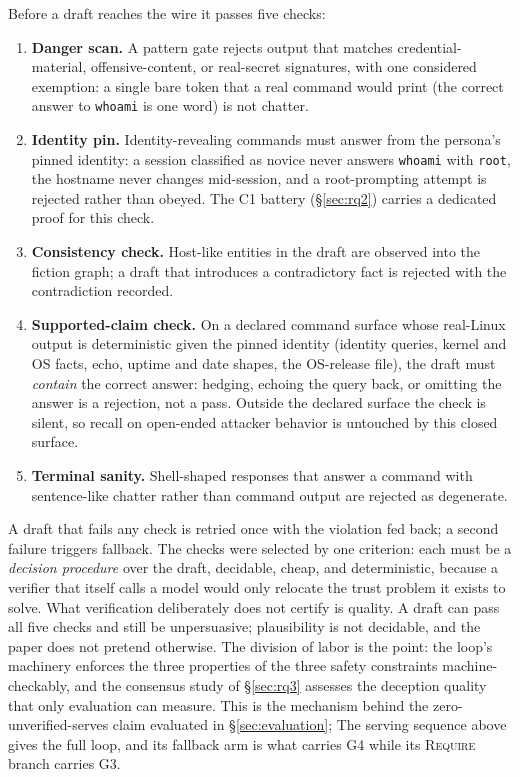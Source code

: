 Before a draft reaches the wire it passes five checks:
\begin{enumerate}
\item \textbf{Danger scan.} A pattern gate rejects output that matches
credential-material, offensive-content, or real-secret signatures, with
one considered exemption: a single bare token that a real command would
print (the correct answer to \texttt{whoami} is one word) is not chatter.
\item \textbf{Identity pin.} Identity-revealing commands must answer from
the persona's pinned identity: a session classified as novice never
answers \texttt{whoami} with \texttt{root}, the hostname never changes
mid-session, and a root-prompting attempt is rejected rather than
obeyed. The C1 battery (\S\ref{sec:rq2}) carries a dedicated proof for
this check.
\item \textbf{Consistency check.} Host-like entities in the draft are
observed into the fiction graph; a draft that introduces a contradictory
fact is rejected with the contradiction recorded.
\item \textbf{Supported-claim check.} On a declared command surface whose
real-Linux output is deterministic given the pinned identity (identity
queries, kernel and OS facts, echo, uptime and date shapes, the
OS-release file), the draft must \emph{contain} the correct answer:
hedging, echoing the query back, or omitting the answer is a rejection,
not a pass. Outside the declared surface the check is silent, so recall
on open-ended attacker behavior is untouched by this closed surface.
\item \textbf{Terminal sanity.} Shell-shaped responses that answer a
command with sentence-like chatter rather than command output are
rejected as degenerate.
\end{enumerate}
A draft that fails any check is retried once with the violation fed back;
a second failure triggers fallback. The checks were selected by one
criterion: each must be a \emph{decision procedure} over the draft,
decidable, cheap, and deterministic, because a verifier that itself calls
a model would only relocate the trust problem it exists to solve. What
verification deliberately does not certify is quality. A draft can pass
all five checks and still be unpersuasive; plausibility is not
decidable, and the paper does not pretend otherwise. The division of
labor is the point: the loop's machinery enforces the three properties
of the three safety constraints machine-checkably, and the consensus study of
\S\ref{sec:rq3} assesses the deception quality that only evaluation can
measure. This is the mechanism behind the zero-unverified-serves claim
evaluated in \S\ref{sec:evaluation};
The serving sequence above gives the full loop, and its fallback arm is
what carries G4 while its
\textsc{Require} branch carries G3.

